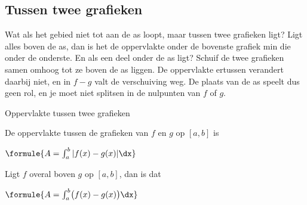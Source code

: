 \subsection{Tussen twee grafieken}

Wat als het gebied niet tot aan de as loopt, maar tussen twee grafieken ligt? Ligt alles boven de as, dan is het de oppervlakte onder de bovenste grafiek min die onder de onderste. En als een deel onder de as ligt? Schuif de twee grafieken samen omhoog tot ze boven de as liggen. De oppervlakte ertussen verandert daarbij niet, en in $f - g$ valt de verschuiving weg. De plaats van de as speelt dus geen rol, en je moet niet splitsen in de nulpunten van $f$ of $g$.


\begin{theorie}
\begin{stelling}{Oppervlakte tussen twee grafieken}
\begin{minipage}[t]{.62\linewidth}
\vspace{0pt}
De oppervlakte tussen de grafieken van $f$ en $g$ op $[a, b]$ is

\vspace{1mm}
\qquad $\formule{A = \int_a^b |f(x) - g(x)|\dx}$

\vspace{1.5mm}
Ligt $f$ overal boven $g$ op $[a, b]$, dan is dat

\vspace{1mm}
\qquad $\formule{A = \int_a^b \bigl(f(x) - g(x)\bigr)\dx}$
\end{minipage}\hfill
\begin{minipage}[t]{.34\linewidth}
\vspace{0pt}
\end{minipage}
\end{stelling}
\end{theorie}

